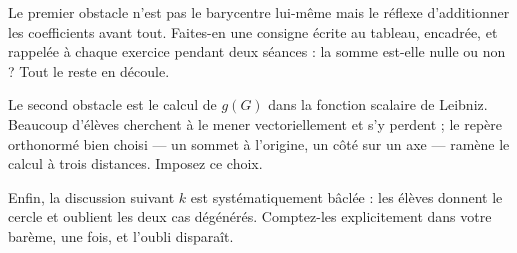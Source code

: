 \begin{notepourlaclasse}
Le premier obstacle n'est pas le barycentre lui-même mais le réflexe
d'additionner les coefficients avant tout. Faites-en une consigne écrite au
tableau, encadrée, et rappelée à chaque exercice pendant deux séances : la
somme est-elle nulle ou non ? Tout le reste en découle.

Le second obstacle est le calcul de $g(G)$ dans la fonction scalaire de
Leibniz. Beaucoup d'élèves cherchent à le mener vectoriellement et s'y
perdent ; le repère orthonormé bien choisi — un sommet à l'origine, un côté
sur un axe — ramène le calcul à trois distances. Imposez ce choix.

Enfin, la discussion suivant $k$ est systématiquement bâclée : les élèves
donnent le cercle et oublient les deux cas dégénérés. Comptez-les
explicitement dans votre barème, une fois, et l'oubli disparaît.
\end{notepourlaclasse}
